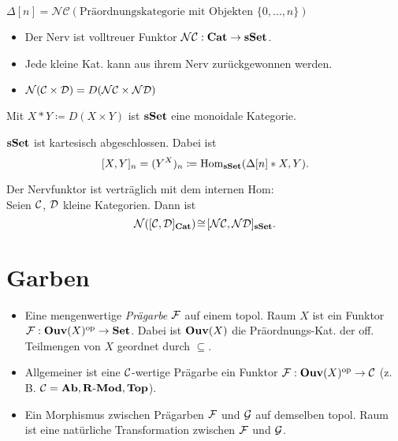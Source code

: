 \documentclass{cheat-sheet}
\newcommand{\NCat}{\mathcal{NC}} %
\newcommand{\Nerve}{\mathcal{N}} %
\begin{document}
\begin{bsp}
 $\Delta[n] = \NCat(\text{Präordnungskategorie mit Objekten } \{ 0, \ldots, n \})$
\end{bsp}

\begin{bem}
  \begin{itemize}
    \item Der Nerv ist volltreuer Funktor $\NCat : \CatC \to \sSet$.
    \item Jede kleine Kat. kann aus ihrem Nerv zurückgewonnen werden.
    \item $\Nerve(\Cat \times \Dat) = D(\Nerve\Cat \times \Nerve\Dat)$
  \end{itemize}
\end{bem}

\begin{bem}
  Mit $X \!*\! Y \coloneqq D(X \!\times\! Y)$ ist $\mathbf{sSet}$ eine monoidale Kategorie.
\end{bem}

\begin{prop}
  $\mathbf{sSet}$ ist kartesisch abgeschlossen. Dabei ist
  \[ [X, Y]_n = (Y^X)_n \coloneqq \operatorname{Hom}_{\mathbf{sSet}}(\Delta[n] * X, Y). \]
\end{prop}

\begin{prop}
  Der Nervfunktor ist verträglich mit dem internen Hom: \\
  Seien $\mathcal{C}$, $\mathcal{D}$ kleine Kategorien. Dann ist
  \[ \Nerve([\Cat, \Dat]_{\CatC}) \!\cong\! [\Nerve\Cat, \Nerve\Dat]_{\sSet}. \]
\end{prop}

\section{Garben}



\begin{defn}
  \begin{itemize}
    \item Eine mengenwertige \emph{Prägarbe} $\mathcal{F}$ auf einem topol. Raum $X$ ist ein Funktor
    $\mathcal{F} : \mathbf{Ouv}(X)^{\mathrm{op}} \to \mathbf{Set}$.
    Dabei ist $\mathbf{Ouv}(X)$ die Präordnungs-Kat. der off. Teilmengen von $X$ geordnet durch $\subseteq$.
    \item Allgemeiner ist eine $\mathcal{C}$-wertige Prägarbe ein Funktor $\mathcal{F} : \mathbf{Ouv}(X)^{\mathrm{op}} \to \mathcal{C}$ (z.\,B. $\mathcal{C} = \mathbf{Ab}, \mathbf{R\text{-}Mod}, \mathbf{Top}$).
    \item Ein Morphismus zwischen Prägarben $\mathcal{F}$ und $\mathcal{G}$ auf demselben topol. Raum ist eine natürliche Transformation zwischen $\mathcal{F}$ und $\mathcal{G}$.
  \end{itemize}
\end{defn}
\end{document}
